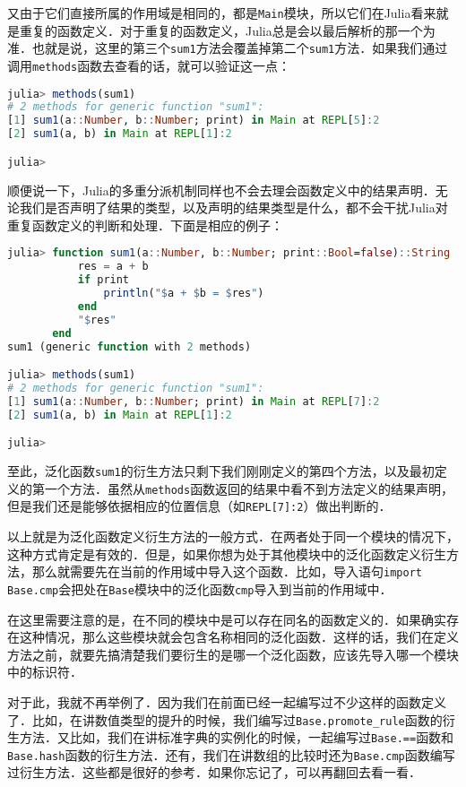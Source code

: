 又由于它们直接所属的作用域是相同的，都是\verb|Main|模块，所以它们在Julia看来就是重复的函数定义．对于重复的函数定义，Julia总是会以最后解析的那一个为准．也就是说，这里的第三个\verb|sum1|方法会覆盖掉第二个\verb|sum1|方法．如果我们通过调用\verb|methods|函数去查看的话，就可以验证这一点：

\begin{lstlisting}[language=julia]
julia> methods(sum1)
# 2 methods for generic function "sum1":
[1] sum1(a::Number, b::Number; print) in Main at REPL[5]:2
[2] sum1(a, b) in Main at REPL[1]:2

julia> 
\end{lstlisting}

顺便说一下，Julia的多重分派机制同样也不会去理会函数定义中的结果声明．无论我们是否声明了结果的类型，以及声明的结果类型是什么，都不会干扰Julia对重复函数定义的判断和处理．下面是相应的例子：

\begin{lstlisting}[language=julia]
julia> function sum1(a::Number, b::Number; print::Bool=false)::String
           res = a + b
           if print
               println("$a + $b = $res")
           end
           "$res"
       end
sum1 (generic function with 2 methods)

julia> methods(sum1)
# 2 methods for generic function "sum1":
[1] sum1(a::Number, b::Number; print) in Main at REPL[7]:2
[2] sum1(a, b) in Main at REPL[1]:2

julia> 
\end{lstlisting}

至此，泛化函数\verb|sum1|的衍生方法只剩下我们刚刚定义的第四个方法，以及最初定义的第一个方法．虽然从\verb|methods|函数返回的结果中看不到方法定义的结果声明，但是我们还是能够依据相应的位置信息（如\verb|REPL[7]:2|）做出判断的．

以上就是为泛化函数定义衍生方法的一般方式．在两者处于同一个模块的情况下，这种方式肯定是有效的．但是，如果你想为处于其他模块中的泛化函数定义衍生方法，那么就需要先在当前的作用域中导入这个函数．比如，导入语句\verb|import Base.cmp|会把处在\verb|Base|模块中的泛化函数\verb|cmp|导入到当前的作用域中．

在这里需要注意的是，在不同的模块中是可以存在同名的函数定义的．如果确实存在这种情况，那么这些模块就会包含名称相同的泛化函数．这样的话，我们在定义方法之前，就要先搞清楚我们要衍生的是哪一个泛化函数，应该先导入哪一个模块中的标识符．

对于此，我就不再举例了．因为我们在前面已经一起编写过不少这样的函数定义了．比如，在讲数值类型的提升的时候，我们编写过\verb|Base.promote_rule|函数的衍生方法．又比如，我们在讲标准字典的实例化的时候，一起编写过\verb|Base.==|函数和\verb|Base.hash|函数的衍生方法．还有，我们在讲数组的比较时还为\verb|Base.cmp|函数编写过衍生方法．这些都是很好的参考．如果你忘记了，可以再翻回去看一看．

